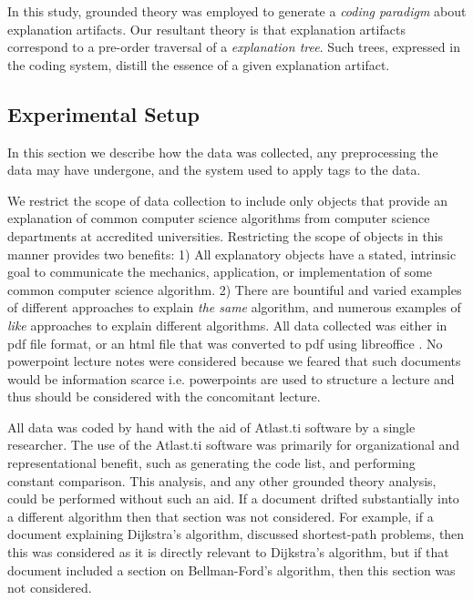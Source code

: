 \documentclass[sigconf]{acmart}
\begin{document}
In this study, grounded theory was employed to generate a \emph{coding paradigm}
about explanation artifacts. Our resultant theory is that explanation artifacts
correspond to a pre-order traversal of a \emph{explanation tree}. Such trees,
expressed in the coding system, distill the essence of a given explanation
artifact. 

\subsection{Experimental Setup}
In this section we describe how the data was collected, any preprocessing the
data may have undergone, and the system used to apply tags to the data. 

We restrict the scope of data collection to include only objects that provide an
explanation of common computer science algorithms from computer science
departments at accredited universities. Restricting the scope of objects in this
manner provides two benefits: 1) All explanatory objects have a stated,
intrinsic goal to communicate the mechanics, application, or implementation of
some common computer science algorithm. 2) There are bountiful and varied
examples of different approaches to explain \emph{the same} algorithm, and
numerous examples of \emph{like} approaches to explain different algorithms. All
data collected was either in pdf file format, or an html file that was converted
to pdf using libreoffice . No powerpoint
lecture notes were considered because we feared that such documents would be
information scarce i.e. powerpoints are used to structure a lecture and thus
should be considered with the concomitant lecture.

All data was coded by hand with the aid of Atlast.ti software  by a single researcher. The use of the Atlast.ti software
was primarily for organizational and representational benefit, such as
generating the code list, and performing constant comparison. This analysis, and
any other grounded theory analysis, could be performed without such an aid. If a
document drifted substantially into a different algorithm then that section was
not considered. For example, if a document explaining Dijkstra's algorithm,
discussed shortest-path problems, then this was considered as it is directly
relevant to Dijkstra's algorithm, but if that document included a section on
Bellman-Ford's algorithm, then this section was not considered.
\end{document}
